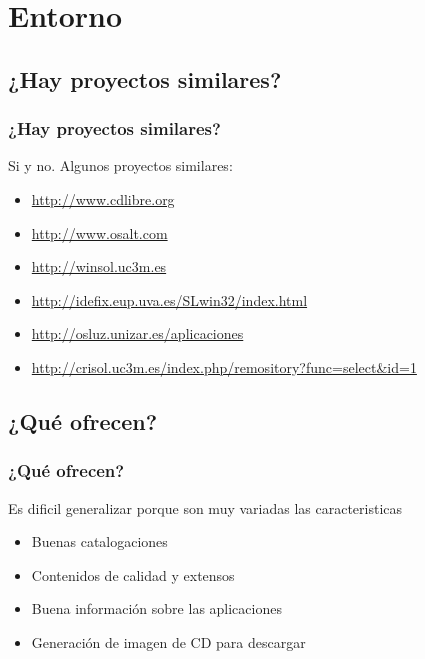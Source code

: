 
\section{Entorno}
	\subsection{¿Hay proyectos similares?}
	\begin{frame}
		\frametitle{¿Hay proyectos similares?}
		Si y no. Algunos proyectos similares:
		\begin{itemize}
			\item <1-| alert@1> \url{http://www.cdlibre.org}
			\item <1-| alert@1> \url{http://www.osalt.com}
			\item <1-| alert@1> \url{http://winsol.uc3m.es}
			\item <1-| alert@1> \url{http://idefix.eup.uva.es/SLwin32/index.html}
			\item <1-| alert@1> \url{http://osluz.unizar.es/aplicaciones}
			\item <1-| alert@1> \url{http://crisol.uc3m.es/index.php/remository?func=select&id=1}
		\end{itemize}
	\end{frame}


	
	\subsection{¿Qué ofrecen?} %
	\begin{frame}
		\frametitle{¿Qué ofrecen?}
		Es dificil generalizar porque son muy variadas las caracteristicas
		\begin{itemize}
			\item <1-| alert@1> Buenas catalogaciones
			\item <2-| alert@2> Contenidos de calidad y extensos
			\item <3-| alert@3> Buena información sobre las aplicaciones
			\item <4-| alert@4> Generación de imagen de CD para descargar
		\end{itemize}
	\end{frame}

